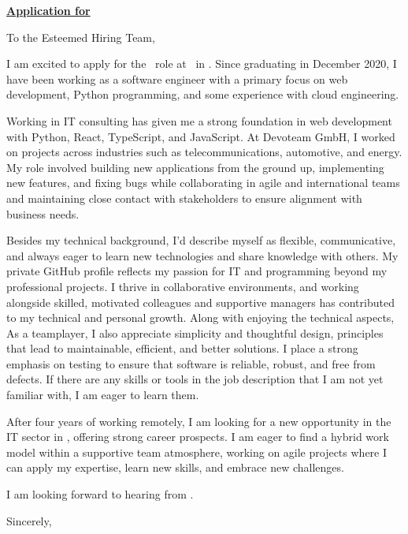 \documentclass[10pt, a4paper]{article}
\begin{document}
\bigskip %

\hfill {}

\noindent \textbf{\underline{Application for \ROLE}}

To the Esteemed Hiring Team,
\bigskip

I am excited to apply for the \ROLE\ role at \COMPANY\ in \CITY. Since graduating in December 2020, I have been working as a software engineer with a primary focus on web development, Python programming, and some experience with cloud engineering.

Working in IT consulting has given me a strong foundation in web development with Python, React, TypeScript, and JavaScript. At Devoteam GmbH, I worked on projects across industries such as telecommunications, automotive, and energy. My role involved building new applications from the ground up, implementing new features, and fixing bugs while collaborating in agile and international teams and maintaining close contact with stakeholders to ensure alignment with business needs.

Besides my technical background, I’d describe myself as flexible, communicative, and always eager to learn new technologies and share knowledge with others. My private GitHub profile reflects my passion for IT and programming beyond my professional projects. I thrive in collaborative environments, and working alongside skilled, motivated colleagues and supportive managers has contributed to my technical and personal growth. Along with enjoying the technical aspects, As a teamplayer, I also appreciate simplicity and thoughtful design, principles that lead to maintainable, efficient, and better solutions. I place a strong emphasis on testing to ensure that software is reliable, robust, and free from defects. If there are any skills or tools in the job description that I am not yet familiar with, I am eager to learn them.

After four years of working remotely, I am looking for a new opportunity in the IT sector in \CITY, offering strong career prospects. I am eager to find a hybrid work model within a supportive team atmosphere, working on agile projects where I can apply my expertise, learn new skills, and embrace new challenges.

I am looking forward to hearing from \COMPANY. 

\bigskip

Sincerely,

\vspace{20pt}

\name
\end{document}
